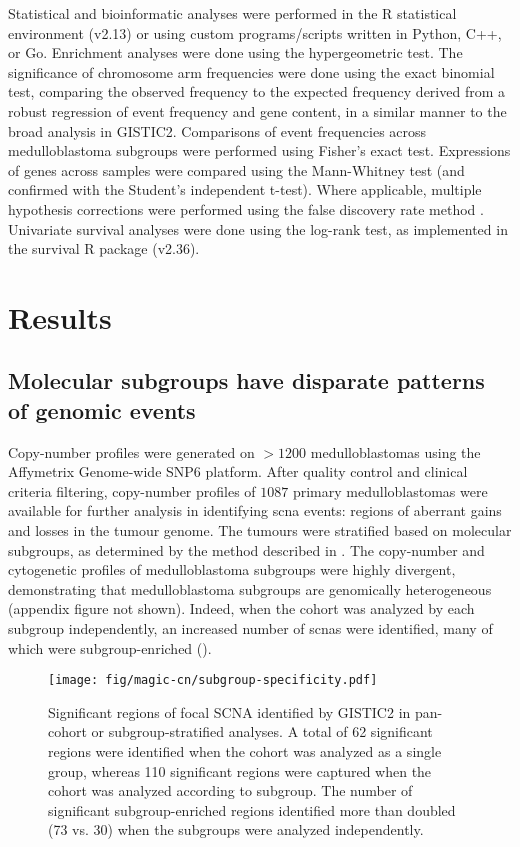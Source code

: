 Statistical and bioinformatic analyses were performed in the R statistical environment (v2.13) or using custom programs/scripts written in Python, C++, or Go. Enrichment analyses were done using the hypergeometric test. The significance of chromosome arm frequencies were done using the exact binomial test, comparing the observed frequency to the expected frequency derived from a robust regression of event frequency and gene content, in a similar manner to the broad analysis in GISTIC2. Comparisons of event frequencies across medulloblastoma subgroups were performed using Fisher’s exact test. Expressions of genes across samples were compared using the Mann-Whitney test (and confirmed with the Student’s independent t-test). Where applicable, multiple hypothesis corrections were performed using the false discovery rate method . Univariate survival analyses were done using the log-rank test, as implemented in the survival R package (v2.36).


\section{Results}

\subsection{Molecular subgroups have disparate patterns of genomic events}

Copy-number profiles were generated on $> 1200$ medulloblastomas using the Affymetrix Genome-wide SNP6 platform. After quality control and clinical criteria filtering, copy-number profiles of $1087$ primary medulloblastomas were available for further analysis in identifying \gls{scna} events: regions of aberrant gains and losses in the tumour genome. The tumours were stratified based on molecular subgroups, as determined by the method described in . The copy-number and cytogenetic profiles of medulloblastoma subgroups were highly divergent, demonstrating that medulloblastoma subgroups are genomically heterogeneous (appendix figure not shown). Indeed, when the cohort was analyzed by each subgroup independently, an increased number of \gls{scnas} were identified, many of which were subgroup-enriched ().

\begin{SCfigure}[5]
	\centering
	\texttt{[image: fig/magic-cn/subgroup-specificity.pdf]}
	\caption[Significant regions of focal SCNA identified by GISTIC2]
	{
	Significant regions of focal SCNA identified by GISTIC2 in pan-cohort or subgroup-stratified analyses.
	A total of 62 significant regions were identified when the cohort was analyzed as a single group, whereas 110 significant regions were captured when the cohort was analyzed according to subgroup. The number of significant subgroup-enriched regions identified more than doubled (73 vs. 30) when the subgroups were analyzed independently.
	}
	\label{fig:subgroup-specificity}
\end{SCfigure}

